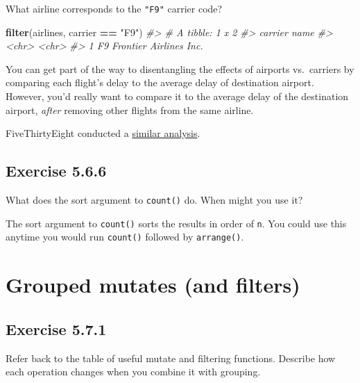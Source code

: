 \documentclass[]{book}
\newenvironment{Shaded}{\begin{snugshade}}{\end{snugshade}}
\newcommand{\CommentTok}[1]{\textcolor[rgb]{0.56,0.35,0.01}{\textit{#1}}}
\newcommand{\KeywordTok}[1]{\textcolor[rgb]{0.13,0.29,0.53}{\textbf{#1}}}
\newcommand{\NormalTok}[1]{#1}
\newcommand{\OperatorTok}[1]{\textcolor[rgb]{0.81,0.36,0.00}{\textbf{#1}}}
\newcommand{\StringTok}[1]{\textcolor[rgb]{0.31,0.60,0.02}{#1}}
\theoremstyle{plain}
\theoremstyle{remark}
\begin{document}
What airline corresponds to the \texttt{"F9"} carrier code?

\begin{Shaded}
\begin{Highlighting}[]
\KeywordTok{filter}\NormalTok{(airlines, carrier }\OperatorTok{==}\StringTok{ "F9"}\NormalTok{)}
\CommentTok{#> # A tibble: 1 x 2}
\CommentTok{#>   carrier name                  }
\CommentTok{#>   <chr>   <chr>                 }
\CommentTok{#> 1 F9      Frontier Airlines Inc.}
\end{Highlighting}
\end{Shaded}

You can get part of the way to disentangling the effects of airports
vs.~carriers by comparing each flight's delay to the average delay of
destination airport. However, you'd really want to compare it to the
average delay of the destination airport, \emph{after} removing other
flights from the same airline.

FiveThirtyEight conducted a
\href{http://fivethirtyeight.com/features/the-best-and-worst-airlines-airports-and-flights-summer-2015-update/}{similar
analysis}.

\hypertarget{exercise-5.6.6}{%
\subsection*{\texorpdfstring{Exercise
{5.6.6}}{Exercise 5.6.6}}\label{exercise-5.6.6}}

What does the sort argument to \texttt{count()} do. When might you use
it?

The sort argument to \texttt{count()} sorts the results in order of
\texttt{n}. You could use this anytime you would run \texttt{count()}
followed by \texttt{arrange()}.

\hypertarget{grouped-mutates-and-filters}{%
\section{Grouped mutates (and
filters)}\label{grouped-mutates-and-filters}}

\hypertarget{exercise-5.7.1}{%
\subsection*{\texorpdfstring{Exercise
{5.7.1}}{Exercise 5.7.1}}\label{exercise-5.7.1}}

Refer back to the table of useful mutate and filtering functions.
Describe how each operation changes when you combine it with grouping.
\end{document}

